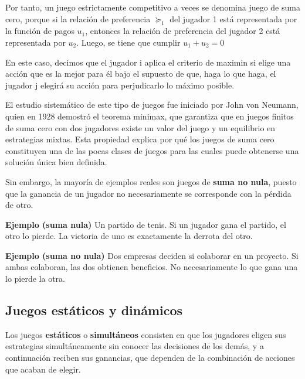 \documentclass[12pt,a4paper,]{book}
\numberwithin{dummy}{section}
\theoremstyle{ocrenumbox}
\theoremstyle{blacknumex}
\theoremstyle{blacknumbox}
\theoremstyle{ocrenum}
\theoremstyle{ocrenum}
\begin{document}
Por tanto, un juego estrictamente competitivo a veces se denomina juego
de suma cero, porque si la relación de preferencia \(\succeq_1\) del
jugador 1 está representada por la función de pagos \(u_1\), entonces la
relación de preferencia del jugador 2 está representada por \(u_2\).
Luego, se tiene que cumplir \(u_1 + u_2 = 0\)

En este caso, decimos que el jugador i aplica el criterio de maximin si
elige una acción que es la mejor para él bajo el supuesto de que, haga
lo que haga, el jugador j elegirá su acción para perjudicarlo lo máximo
posible.

El estudio sistemático de este tipo de juegos fue iniciado por John von
Neumann, quien en 1928 demostró el teorema minimax, que garantiza que en
juegos finitos de suma cero con dos jugadores existe un valor del juego
y un equilibrio en estrategias mixtas. Esta propiedad explica por qué
los juegos de suma cero constituyen una de las pocas clases de juegos
para las cuales puede obtenerse una solución única bien definida.

Sin embargo, la mayoría de ejemplos reales son juegos de \textbf{suma no
nula}, puesto que la ganancia de un jugador no necesariamente se
corresponde con la pérdida de otro.

\begin{tcolorbox}[colback=blue!10] 
\textbf{Ejemplo (suma nula)}
Un partido de tenis.  
Si un jugador gana el partido, el otro lo pierde.  
La victoria de uno es exactamente la derrota del otro.
\end{tcolorbox}

\begin{tcolorbox}[colback=blue!10] 
\textbf{Ejemplo (suma no nula)}
Dos empresas deciden si colaborar en un proyecto.  
Si ambas colaboran, las dos obtienen beneficios.  
No necesariamente lo que gana una lo pierde la otra.
\end{tcolorbox}

\subsection{Juegos estáticos y
dinámicos}\label{juegos-estuxe1ticos-y-dinuxe1micos}

Los juegos \textbf{estáticos} o \textbf{simultáneos} consisten en que
los jugadores eligen sus estrategias simultáneamente sin conocer las
decisiones de los demás, y a continuación reciben sus ganancias, que
dependen de la combinación de acciones que acaban de elegir.
\end{document}
